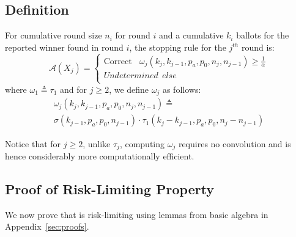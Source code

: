 \subsection{Definition}
\label{sec:prov_def}
\begin{definition}
    \label{def:minervatwo}
    For cumulative round size $n_i$ for round $i$ and a cumulative $k_i$ ballots for the reported winner found in round $i$, the \R \Providence stopping rule for the $j^{th}$ round is:
$$
\mathcal{A}(X_{j})=  \left\{ \begin{array}{ll} \text{Correct} ~~~~ \omega_{j}(k_{j}, k_{j-1}, p_a, p_0, n_j, n_{j-1}) \geq \frac{1}{\alpha}\\
        Undetermined ~~else \\
    \end{array}
    \right .
$$
where $\omega _{1}\triangleq \tau_{1}$ and for $j\ge 2$, we define $\omega _{j}$ as follows:
\begin{equation}
    \begin{aligned}
    \omega_{j}(k_{j}, k_{j-1}, p_a, p_0, n_{j}, n_{j-1})
    \triangleq\\
    \sigma(k_{j-1},p_a,p_0,n_{j-1})\cdot \tau_1(k_{j}-k_{j-1},p_a,p_0,n_j-n_{j-1})
    \end{aligned}
\end{equation}
\end{definition}

Notice that for $j\ge 2$, unlike $\tau_j$, computing $\omega_j$ requires no convolution and is hence considerably more computationally efficient. 

\subsection{Proof of Risk-Limiting Property}
\label{sec:proof}
We now prove that \Providence is risk-limiting using lemmas from basic algebra in Appendix~\ref{sec:proofs}.

